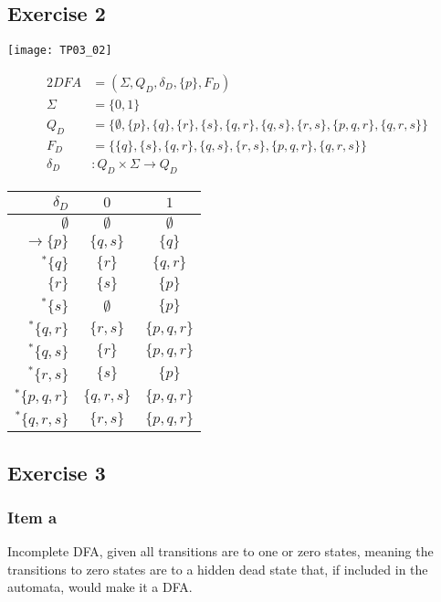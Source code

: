 {\subsection{Exercise 2}
\label{subsec:03_02}
\begin{center} \texttt{[image: TP03\_02]} \end{center}
\begin{alignat*}{2}
	DFA       &= (\Sigma, Q_D, \delta_D, \{p\}, F_D)\\
	\Sigma    &= \{0,1\}\\
	Q_D       &= \{\emptyset,\{p\},\{q\},\{r\},\{s\},\{q,r\},\{q,s\},\{r,s\},\{p,q,r\},\{q,r,s\}\}\\
	F_D       &= \{\{q\},\{s\},\{q,r\},\{q,s\},\{r,s\},\{p,q,r\},\{q,r,s\}\}\\
	\delta_D &\colon Q_D \times \Sigma \rightarrow Q_D
\end{alignat*}
\begin{center}
\begin{tabular}{ r | c c }
 $\delta_D$ & $0$ & $1$ \\
 \hline
 $\emptyset              $ & $\emptyset  $ & $\emptyset  $ \\
 $\rightarrow \{p      \}$ & $\{  q,  s\}$ & $\{  q    \}$ \\  
 $^*       \{  q    \}$ & $\{    r  \}$ & $\{  q,r  \}$ \\
 $            \{    r  \}$ & $\{      s\}$ & $\{p      \}$ \\
 $^*       \{      s\}$ & $\emptyset  $ & $\{p      \}$ \\
 $^*       \{  q,r  \}$ & $\{    r,s\}$ & $\{p,q,r  \}$ \\
 $^*       \{  q,  s\}$ & $\{    r  \}$ & $\{p,q,r  \}$ \\
 $^*       \{    r,s\}$ & $\{      s\}$ & $\{p      \}$ \\
 $^*       \{p,q,r  \}$ & $\{  q,r,s\}$ & $\{p,q,r  \}$ \\
 $^*       \{  q,r,s\}$ & $\{    r,s\}$ & $\{p,q,r  \}$
\end{tabular}
\end{center}
\pagebreak
\subsection{Exercise 3} \label{subsec:03_03}
\subsubsection{Item a}
Incomplete DFA, given all transitions are to one or zero states, meaning the transitions to zero states are to a hidden dead state that, if included in the automata, would make it a DFA.
}
